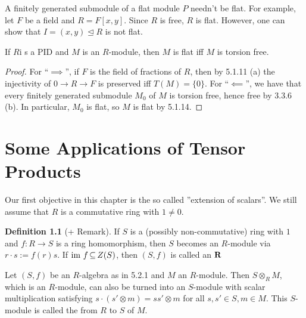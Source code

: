 \documentclass[11pt]{book}
\theoremstyle{definition}   \newtheorem{defn}[counter]{Definition} %
\newcommand{\nsg}{\mathrel{\unlhd}}   \newcommand{\ind}{\parindent24pt}   \newcommand{\vn}{\varnothing}    \newcommand{\lar}{\longrightarrow}
\DeclareMathOperator{\ra}{\rightarrow}   \DeclareMathOperator{\Poly}{\mathbf{P}}   \DeclareMathOperator{\spn}{\textnormal{span}}   \DeclareMathOperator{\aut}{\textnormal{Aut}}
\newcommand{\vs}{\vspace{8pt}}   \newcommand{\hs}{\hspace{8pt}}
\numberwithin{counter}{chapter}
\begin{document}
\vs

\begin{remark*}
A finitely generated submodule of a flat module $P$ needn't be flat. For example, let $F$ be a field and $R = F[x,y]$. Since $R$ is free, $R$ is flat. However, one can show that $I = (x,y) \nsg R$ is not flat. 
\end{remark*}

\vs

\begin{corollary}
If $R$i s a PID and $M$ is an $R$-module, then $M$ is flat iff $M$ is torsion free. 
\end{corollary}

\begin{proof}
For ``$\implies$'', if $F$ is the field of fractions of $R$, then by 5.1.11 (a) the injectivity of $0 \ra R \ra F$ is preserved iff $T(M) = \{0\}$. For ``$\impliedby$'', we have that every finitely generated submodule $M_0$ of $M$ is torsion free, hence free by 3.3.6 (b). In particular, $M_0$ is flat, so $M$ is flat by 5.1.14. 
\end{proof}





\chapter{Some Applications of Tensor Products}




Our first objective in this chapter is the so called ''extension of scalars''. We still assume that $R$ is a commutative ring with $1 \ne 0$. 

\vs

\begin{defn}[+ Remark]
If $S$ is a (possibly non-commutative) ring with $1$ and $f : R \ra S$ is a ring homomorphism, then $S$ becomes an $R$-module via $r \cdot s := f(r) s$. If $\textnormal{im } f \operatorname{\subseteq} Z(S)$, then $(S,f)$ is called an $\mathbf{R}$ 
\end{defn}


\vs

\begin{lemma}[+ Definition]
Let $(S,f)$ be an $R$-algebra as in 5.2.1 and $M$ an $R$-module. Then $S \otimes_R M$, which is an $R$-module, can also be turned into an $S$-module with scalar multiplication satisfying $s \cdot (s' \otimes m) = ss' \otimes m$ for all $s,s' \in S, m \in M$. This $S$-module is called the  from $R$ to $S$ of $M$.
\end{lemma}
\end{document}
